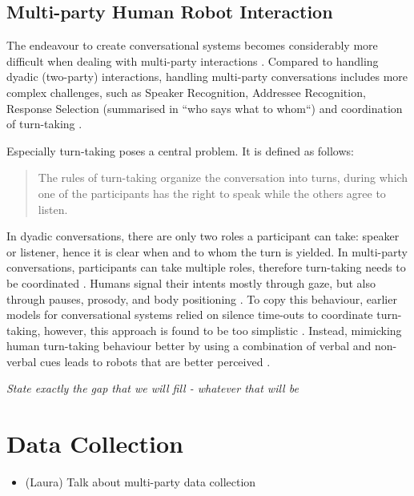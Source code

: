 \documentclass[hidelinks, 11pt]{article}
\begin{document}
\subsection{Multi-party Human Robot Interaction}
\label{subsec:multi_party}
The endeavour to create conversational systems becomes considerably more difficult when dealing with multi-party interactions \cite{Group_1_unpublished_paper}. Compared to handling dyadic (two-party) interactions, handling multi-party conversations includes more complex challenges, such as Speaker Recognition, Addressee Recognition, Response Selection (summarised in “who says what to whom“) and coordination of turn-taking \cite{Group_1_unpublished_paper,Johansson_Skantze_2015}.

Especially turn-taking poses a central problem. It is defined as follows:

\begin{quote}
  The rules of turn-taking organize the conversation into turns, during which one of the participants has the right to speak while the others agree to listen. \cite{Żarkowski_2019}
\end{quote}

In dyadic conversations, there are only two roles a participant can take: speaker or listener, hence it is clear when and to whom the turn is yielded. In multi-party conversations, participants can take multiple roles, therefore turn-taking needs to be coordinated \cite{Johansson_Skantze_2015}. Humans signal their intents mostly through gaze, but also through pauses, prosody, and body positioning \cite{Żarkowski_2019}. To copy this behaviour, earlier models for conversational systems relied on silence time-outs to coordinate turn-taking, however, this approach is found to be too simplistic \cite{skantze_turn_taking_2021}. Instead, mimicking human turn-taking behaviour better by using a combination of verbal and non-verbal cues leads to robots that are better perceived \cite{moujahid_multi_party_2022}.

\textit{State exactly the gap that we will fill - whatever that will be}


\section{Data Collection}
\label{sec:data_collection}

\begin{itemize}
  \item (Laura) Talk about multi-party data collection
\end{itemize}
\end{document}

